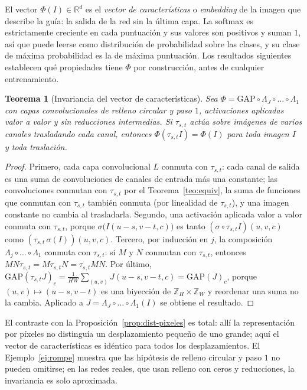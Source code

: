 \documentclass[11pt]{article}
\newtheorem{teorema}{Teorema}[section]
\theoremstyle{definition}
\theoremstyle{remark}
\newcommand{\R}{\mathbb{R}}
\begin{document}
\noindent El vector $\Phi(I)\in\R^d$ es el \emph{vector de características} o \emph{embedding} de la imagen que describe la guía: la salida de la red sin la última capa. La softmax es estrictamente creciente en cada puntuación y sus valores son positivos y suman $1$, así que puede leerse como distribución de probabilidad sobre las clases, y su clase de máxima probabilidad es la de máxima puntuación. Los resultados siguientes establecen qué propiedades tiene $\Phi$ por construcción, antes de cualquier entrenamiento.

\begin{teorema}[Invariancia del vector de características]\label{teo:invariancia-cnn}
\noindent Sea $\Phi=\mathrm{GAP}\circ\Lambda_J\circ\dots\circ\Lambda_1$ con capas convolucionales de relleno circular y paso $1$, activaciones aplicadas valor a valor y sin reducciones intermedias. Si $\tau_{s,t}$ actúa sobre imágenes de varios canales trasladando cada canal, entonces $\Phi(\tau_{s,t}I)=\Phi(I)$ para toda imagen $I$ y toda traslación.
\end{teorema}
\begin{proof}
\noindent Primero, cada capa convolucional $L$ conmuta con $\tau_{s,t}$: cada canal de salida es una suma de convoluciones de canales de entrada más una constante; las convoluciones conmutan con $\tau_{s,t}$ por el Teorema~\ref{teo:equiv}, la suma de funciones que conmutan con $\tau_{s,t}$ también conmuta (por linealidad de $\tau_{s,t}$), y una imagen constante no cambia al trasladarla. Segundo, una activación aplicada valor a valor conmuta con $\tau_{s,t}$, porque $\sigma\big(I(u-s,v-t,c)\big)$ es tanto $(\sigma\circ\tau_{s,t}I)(u,v,c)$ como $(\tau_{s,t}\,\sigma(I))(u,v,c)$. Tercero, por inducción en $j$, la composición $\Lambda_j\circ\dots\circ\Lambda_1$ conmuta con $\tau_{s,t}$: si $M$ y $N$ conmutan con $\tau_{s,t}$, entonces $MN\tau_{s,t}=M\tau_{s,t}N=\tau_{s,t}MN$. Por último, $\mathrm{GAP}(\tau_{s,t}J)_c=\frac1{HW}\sum_{(u,v)}J(u-s,v-t,c)=\mathrm{GAP}(J)_c$, porque $(u,v)\mapsto(u-s,v-t)$ es una biyección de $\mathbb Z_H\times\mathbb Z_W$ y reordenar una suma no la cambia. Aplicado a $J=\Lambda_J\circ\dots\circ\Lambda_1(I)$ se obtiene el resultado.
\end{proof}

\noindent El contraste con la Proposición~\ref{prop:dist-pixeles} es total: allí la representación por píxeles no distinguía un desplazamiento pequeño de uno grande; aquí el vector de características es idéntico para todos los desplazamientos. El Ejemplo~\ref{ej:rompe} muestra que las hipótesis de relleno circular y paso $1$ no pueden omitirse; en las redes reales, que usan relleno con ceros y reducciones, la invariancia es solo aproximada.
\end{document}
